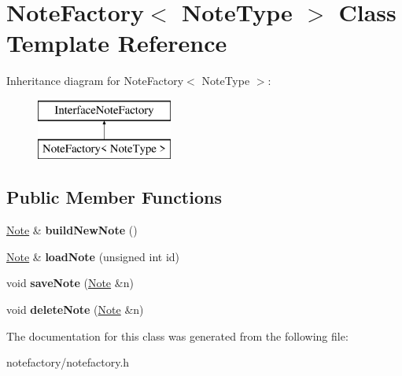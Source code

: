 \hypertarget{class_note_factory}{\section{Note\-Factory$<$ Note\-Type $>$ Class Template Reference}
\label{class_note_factory}
}
Inheritance diagram for Note\-Factory$<$ Note\-Type $>$\-:\begin{figure}[H]
\begin{center}
\leavevmode
\includegraphics[height=2.000000cm]{class_note_factory}
\end{center}
\end{figure}
\subsection*{Public Member Functions}
\begin{DoxyCompactItemize}
\item 
\hypertarget{class_note_factory_a8d6a86e4976e76cf7b6e6adf87ff8bf1}{\hyperlink{class_note}{Note} \& {\bfseries build\-New\-Note} ()}\label{class_note_factory_a8d6a86e4976e76cf7b6e6adf87ff8bf1}

\item 
\hypertarget{class_note_factory_ad5c280ac27cebfa299c90c4c9446402f}{\hyperlink{class_note}{Note} \& {\bfseries load\-Note} (unsigned int id)}\label{class_note_factory_ad5c280ac27cebfa299c90c4c9446402f}

\item 
\hypertarget{class_note_factory_a27dbfdd2a6f27cb45eb912ce6acc83c8}{void {\bfseries save\-Note} (\hyperlink{class_note}{Note} \&n)}\label{class_note_factory_a27dbfdd2a6f27cb45eb912ce6acc83c8}

\item 
\hypertarget{class_note_factory_a46315a96d9427c54e0df402deb798d19}{void {\bfseries delete\-Note} (\hyperlink{class_note}{Note} \&n)}\label{class_note_factory_a46315a96d9427c54e0df402deb798d19}

\end{DoxyCompactItemize}


The documentation for this class was generated from the following file\-:\begin{DoxyCompactItemize}
\item 
notefactory/notefactory.\-h\end{DoxyCompactItemize}
